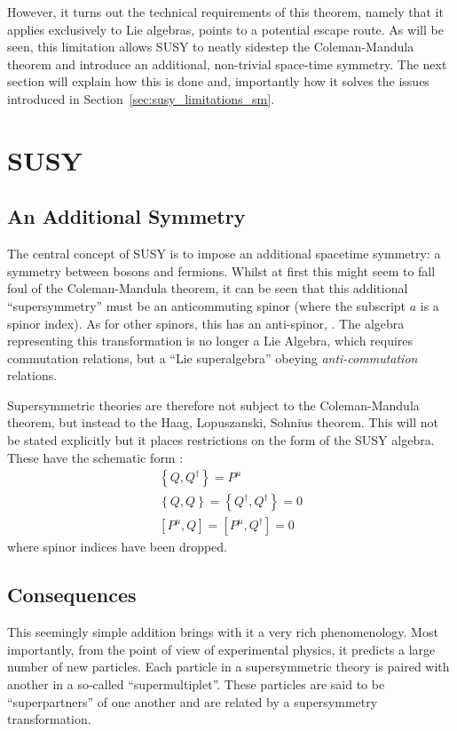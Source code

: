 However, it turns out the technical requirements of this theorem, namely that it
applies exclusively to Lie algebras, points to a potential escape route. As will
be seen, this limitation allows \acl{SUSY} to neatly sidestep the
Coleman-Mandula theorem and introduce an additional, non-trivial space-time
symmetry. The next section will explain how this is done and, importantly how it
solves the issues introduced in Section~\ref{sec:susy_limitations_sm}.

\section{\acl{SUSY}}
\subsection{An Additional Symmetry}
The central concept of \ac{SUSY} is to impose an additional spacetime symmetry:
a symmetry between bosons and fermions. Whilst at first this might seem to fall
foul of the Coleman-Mandula theorem, it can be seen that this additional
``supersymmetry'' must be an anticommuting spinor \Qa (where the subscript $a$
is a spinor index). As for other spinors, this has an anti-spinor, \AQa. The
algebra representing this transformation is no longer a Lie Algebra, which
requires commutation relations, but a ``Lie superalgebra'' obeying
\emph{anti-commutation} relations.

Supersymmetric theories are therefore not subject to the Coleman-Mandula
theorem, but instead to the Haag, Lopuszanski, Sohnius theorem. This will not be
stated explicitly but it places restrictions on the form of the \ac{SUSY}
algebra. These have the schematic form \cite{susy_primer}:
\begin{eqnarray}
\left\{Q,Q^{\dagger}\right\} = P^{\mu}\\
\left\{Q,Q\right\} = \left\{Q^{\dagger}, Q^{\dagger}\right\} = 0\\
\left[P^{\mu}, Q\right] = \left[P^{\mu}, Q^{\dagger}\right] = 0\label{eqn:susy_commutator}
\end{eqnarray}
where spinor indices have been dropped.

\subsection{Consequences}
\label{sec:consequences}
This seemingly simple addition brings with it a very rich phenomenology. Most
importantly, from the point of view of experimental physics, it predicts a large
number of new particles. Each particle in a supersymmetric theory is paired with
another in a so-called ``supermultiplet''. These particles are said to be
``superpartners'' of one another and are related by a supersymmetry
transformation.


